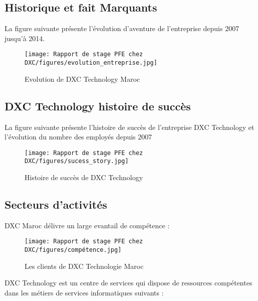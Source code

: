 \newpage

\subsection{Historique et fait Marquants }

La figure suivante présente l’évolution d’aventure de l’entreprise depuis 2007 jusqu’à 2014.

\begin{figure}[!h]
    \centering
    \texttt{[image: Rapport de stage PFE chez DXC/figures/evolution\_entreprise.jpg]}
    \caption{Evolution de DXC Technology Maroc}
\end{figure}

\newpage
\subsection{DXC Technology histoire de succès }

La figure suivante présente l’histoire de succès de l’entreprise DXC Technology et l’évolution du nombre des employés depuis 2007

\begin{figure}[!h]
    \centering
    \texttt{[image: Rapport de stage PFE chez DXC/figures/sucess\_story.jpg]}
    \caption{Histoire de succès de DXC Technology}
\end{figure}

\subsection{Secteurs d’activités}

DXC Maroc délivre un large evantail de compétence :

\begin{figure}[!h]
    \centering
    \texttt{[image: Rapport de stage PFE chez DXC/figures/compétence.jpg]}
    \caption{Les clients de DXC Technologie Maroc}
\end{figure}

\newpage
DXC Technology est un centre de services qui dispose de ressources compétentes dans les
métiers de services informatiques suivants :

